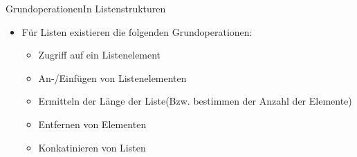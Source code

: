 \begin{frame}{Grundoperationen}{In Listenstrukturen}
	\begin{itemize}
		\item Für Listen existieren die folgenden Grundoperationen:
		\begin{itemize}
			\item Zugriff auf ein Listenelement
			\item An-/Einfügen von Listenelementen
			\item Ermitteln der Länge der Liste(Bzw. bestimmen der Anzahl der Elemente)
			\item Entfernen von Elementen
			\item Konkatinieren von Listen
		\end{itemize}
	\end{itemize}
\end{frame}